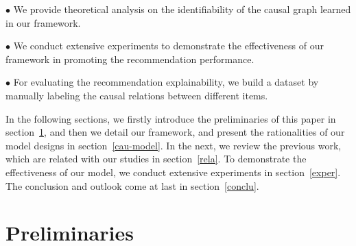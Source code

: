 \documentclass[conference]{IEEEtran}
\theoremstyle{definition}
\theoremstyle{theorem}
\theoremstyle{proof}
\theoremstyle{remark}
\begin{document}
$\bullet$ We provide theoretical analysis on the identifiability of the causal graph learned in our framework.

$\bullet$ We conduct extensive experiments to demonstrate the effectiveness of our framework in promoting the recommendation performance.

$\bullet$ For evaluating the recommendation explainability, we build a dataset by manually labeling the causal relations between different items.


In the following sections, we firstly introduce the preliminaries of this paper in section~\ref{pre}, and then we detail our framework, and present the rationalities of our model designs in section~\ref{cau-model}. In the next, we review the previous work, which are related with our studies in section~\ref{rela}. To demonstrate the effectiveness of our model, we conduct extensive experiments in section~\ref{exper}. The conclusion and outlook come at last in section~\ref{conclu}.







\section{Preliminaries}\label{pre}
\end{document}
